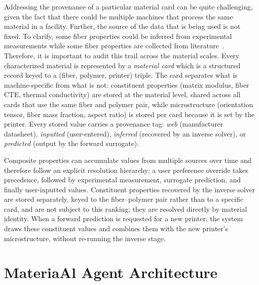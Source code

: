 \documentclass[preprint,review,10pt,number]{elsarticle}
\begin{document}
Addressing the provenance of a particular material card can be quite challenging, given the fact that there could be multiple machines that process the same material in a facility.
Further, the source of the data that is being used is not fixed.
To clarify, some fiber properties could be inferred from experimental measurements\cite{ghosh2025framework} while some fiber properties are collected from literature~\cite{thomas2022machine}.
Therefore, it is important to audit this trail across the material scales.
Every characterized material is represented by a \textit{material card} which is a structured record keyed to a (fiber, polymer, printer) triple.
The card separates what is machine-specific from what is not: constituent properties (matrix modulus, fiber CTE, thermal conductivity) are stored at the material level, shared across all cards that use the same fiber and polymer pair, while microstructure (orientation tensor, fiber mass fraction, aspect ratio) is stored per card because it is set by the printer.
Every stored value carries a provenance tag: \textit{web} (manufacturer datasheet), \textit{inputted} (user-entered), \textit{inferred }(recovered by an inverse solver), or \textit{predicted }(output by the forward surrogate).

Composite properties can accumulate values from multiple sources over time and therefore follow an explicit resolution hierarchy: a user preference override takes precedence, followed by experimental measurement, surrogate prediction, and finally user-inputted values. 
Constituent properties recovered by the inverse solver are stored separately, keyed to the fiber--polymer pair rather than to a specific card, and are not subject to this ranking; they are resolved directly by material identity.
When a forward prediction is requested for a new printer, the system draws these constituent values and combines them with the new printer's microstructure, without re-running the inverse stage.

\section{MateriaAl Agent Architecture}
\end{document}
